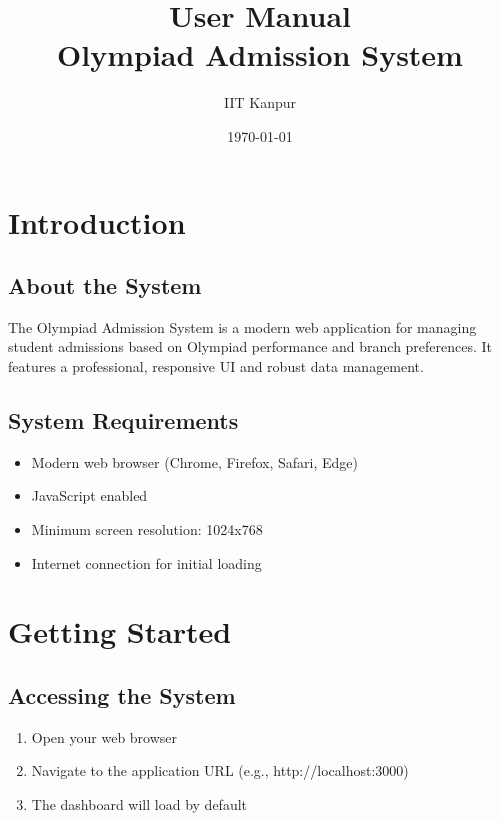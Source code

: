 \documentclass[12pt]{article}
\title{User Manual\\
       Olympiad Admission System}
\author{IIT Kanpur}
\date{\today}
\begin{document}
\maketitle

\tableofcontents
\newpage

\section{Introduction}

\subsection{About the System}
The Olympiad Admission System is a modern web application for managing student admissions based on Olympiad performance and branch preferences. It features a professional, responsive UI and robust data management.

\subsection{System Requirements}
\begin{itemize}
    \item Modern web browser (Chrome, Firefox, Safari, Edge)
    \item JavaScript enabled
    \item Minimum screen resolution: 1024x768
    \item Internet connection for initial loading
\end{itemize}

\section{Getting Started}

\subsection{Accessing the System}
\begin{enumerate}
    \item Open your web browser
    \item Navigate to the application URL (e.g., http://localhost:3000)
    \item The dashboard will load by default
\end{enumerate}
\end{document}

